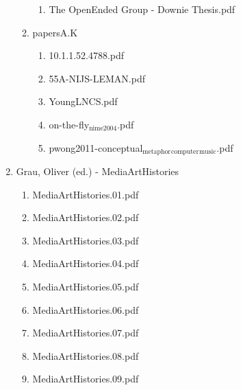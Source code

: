 \documentclass[11pt]{article}
\begin{document}
\begin{enumerate}
\begin{enumerate}
\begin{enumerate}
\item The OpenEnded Group - Downie Thesis.pdf
\label{sec-1-1-1-1-11-24-31-4-12}
\end{enumerate}

\item papersA.K
\label{sec-1-1-1-1-11-24-31-5}
\begin{enumerate}
\item 10.1.1.52.4788.pdf
\label{sec-1-1-1-1-11-24-31-5-1}

\item 55A-NIJS-LEMAN.pdf
\label{sec-1-1-1-1-11-24-31-5-2}

\item YoungLNCS.pdf
\label{sec-1-1-1-1-11-24-31-5-3}

\item on-the-fly$_{\text{nime2004}}$.pdf
\label{sec-1-1-1-1-11-24-31-5-4}

\item pwong2011-conceptual$_{\text{metaphor}}$$_{\text{computer}}$$_{\text{music}}$.pdf
\label{sec-1-1-1-1-11-24-31-5-5}
\end{enumerate}
\end{enumerate}

\item Grau, Oliver (ed.) - MediaArtHistories
\label{sec-1-1-1-1-11-24-32}
\begin{enumerate}
\item MediaArtHistories.01.pdf
\label{sec-1-1-1-1-11-24-32-1}

\item MediaArtHistories.02.pdf
\label{sec-1-1-1-1-11-24-32-2}

\item MediaArtHistories.03.pdf
\label{sec-1-1-1-1-11-24-32-3}

\item MediaArtHistories.04.pdf
\label{sec-1-1-1-1-11-24-32-4}

\item MediaArtHistories.05.pdf
\label{sec-1-1-1-1-11-24-32-5}

\item MediaArtHistories.06.pdf
\label{sec-1-1-1-1-11-24-32-6}

\item MediaArtHistories.07.pdf
\label{sec-1-1-1-1-11-24-32-7}

\item MediaArtHistories.08.pdf
\label{sec-1-1-1-1-11-24-32-8}

\item MediaArtHistories.09.pdf
\label{sec-1-1-1-1-11-24-32-9}


\end{enumerate}
\end{enumerate}
\end{document}
